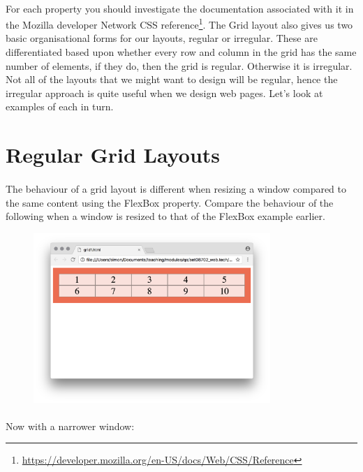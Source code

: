 \paragraph{} For each property you should investigate the documentation associated with it in the Mozilla developer Network CSS reference\footnote{\url{https://developer.mozilla.org/en-US/docs/Web/CSS/Reference}}. The Grid layout also gives us two basic organisational forms for our layouts, regular or irregular. These are differentiated based upon whether every row and column in the grid has the same number of elements, if they do, then the grid is regular. Otherwise it is irregular. Not all of the layouts that we might want to design will be regular, hence the irregular approach is quite useful when we design web pages. Let's look at examples of each in turn.




\section{Regular Grid Layouts}
\paragraph{} The behaviour of a grid layout is different when resizing a window compared to the same content using the FlexBox property. Compare the behaviour of the following when a window is resized to that of the FlexBox example earlier.


\begin{figure}[H]
\centering
\includegraphics[width=0.8\textwidth]{figures/grid-wide}
\label{fig:grid-wide}
\caption{}
\end{figure}


\paragraph{} Now with a narrower window:

